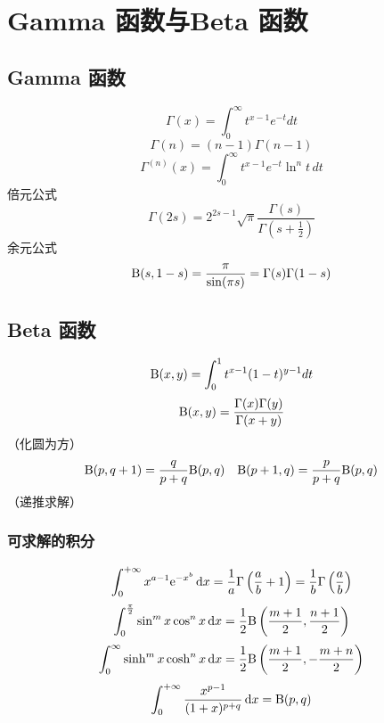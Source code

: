 
\chapter{Gamma 函数与Beta 函数}

\section{Gamma 函数}
\[
    \Gamma(x) = \int_0^\infty t^{x-1} e^{-t} dt
\]
\[
    \Gamma(n) = (n-1)\Gamma(n-1)
\]
\[
    \Gamma^{(n)}(x) = \int_0^\infty t^{x-1} e^{-t} \ln^n t \, dt
\]
倍元公式
\[
    \Gamma(2s) = 2^{2s-1} \sqrt{\pi}
    \frac{\Gamma(s)}{\Gamma(s+\frac{1}{2})}
\]
余元公式
\[
    \mathrm{B}(s, 1-s) = \frac{\pi}{\sin(\pi s)} = \Gamma(s)
    \Gamma(1-s)
\]
\section{Beta 函数}

\[
    \mathrm{B}(x, y) = \int_0^1 t^{x-1} (1-t)^{y-1} dt
\]
\[
    \mathrm{B}(x, y) = \frac{\Gamma(x) \Gamma(y)}{\Gamma(x+y)}
\]
（化圆为方）
\[
    \mathrm{B}(p ,q+1) = \frac{q}{p+q} \mathrm{B}(p,q) \quad
    \mathrm{B}(p+1, q) = \frac{p}{p+q} \mathrm{B}(p,q)
\]
（递推求解）
\subsection{可求解的积分}
\[
    \int_{0}^{+\infty} x^{a-1} \e^{-x^{b}} \d{x} =
    \frac{1}{a} \Gamma\left( \frac{a}{b} +1 \right) = \frac{1}{b}
    \Gamma\left(\frac{a}{b}\right)
\]
\[
    \int_{0}^{\frac{\pi}{2}} \sin^{m} x \cos^{n} x \d{x} =
    \frac{1}{2} \betafunc\left(\frac{m+1}{2}, \frac{n+1}{2}\right)
\]
\[
    \int_{0}^{\infty} \sinh^{m} x \cosh^{n} x \d{x} =
    \frac{1}{2} \betafunc\left(\frac{m+1}{2}, -\frac{m+n}{2}\right)
\]
\[
    \int_{0}^{+\infty } \frac{x^{p-1}}{(1+x)^{p+q}} \d{x} =
    \betafunc(p, q)
\]
